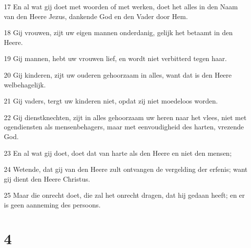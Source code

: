 \par 17 En al wat gij doet met woorden of met werken, doet het alles in den Naam van den Heere Jezus, dankende God en den Vader door Hem.
\par 18 Gij vrouwen, zijt uw eigen mannen onderdanig, gelijk het betaamt in den Heere.
\par 19 Gij mannen, hebt uw vrouwen lief, en wordt niet verbitterd tegen haar.
\par 20 Gij kinderen, zijt uw ouderen gehoorzaam in alles, want dat is den Heere welbehagelijk.
\par 21 Gij vaders, tergt uw kinderen niet, opdat zij niet moedeloos worden.
\par 22 Gij dienstknechten, zijt in alles gehoorzaam uw heren naar het vlees, niet met ogendiensten als mensenbehagers, maar met eenvoudigheid des harten, vrezende God.
\par 23 En al wat gij doet, doet dat van harte als den Heere en niet den mensen;
\par 24 Wetende, dat gij van den Heere zult ontvangen de vergelding der erfenis; want gij dient den Heere Christus.
\par 25 Maar die onrecht doet, die zal het onrecht dragen, dat hij gedaan heeft; en er is geen aanneming des persoons.

\chapter{4}

